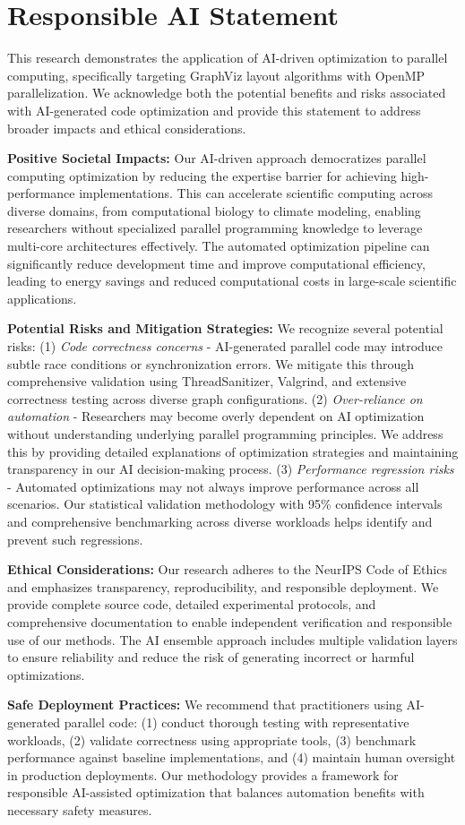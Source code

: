 \section*{Responsible AI Statement}

This research demonstrates the application of AI-driven optimization to parallel computing, specifically targeting GraphViz layout algorithms with OpenMP parallelization. We acknowledge both the potential benefits and risks associated with AI-generated code optimization and provide this statement to address broader impacts and ethical considerations.

\textbf{Positive Societal Impacts:} Our AI-driven approach democratizes parallel computing optimization by reducing the expertise barrier for achieving high-performance implementations. This can accelerate scientific computing across diverse domains, from computational biology to climate modeling, enabling researchers without specialized parallel programming knowledge to leverage multi-core architectures effectively. The automated optimization pipeline can significantly reduce development time and improve computational efficiency, leading to energy savings and reduced computational costs in large-scale scientific applications.

\textbf{Potential Risks and Mitigation Strategies:} We recognize several potential risks: (1) \textit{Code correctness concerns} - AI-generated parallel code may introduce subtle race conditions or synchronization errors. We mitigate this through comprehensive validation using ThreadSanitizer, Valgrind, and extensive correctness testing across diverse graph configurations. (2) \textit{Over-reliance on automation} - Researchers may become overly dependent on AI optimization without understanding underlying parallel programming principles. We address this by providing detailed explanations of optimization strategies and maintaining transparency in our AI decision-making process. (3) \textit{Performance regression risks} - Automated optimizations may not always improve performance across all scenarios. Our statistical validation methodology with 95\% confidence intervals and comprehensive benchmarking across diverse workloads helps identify and prevent such regressions.

\textbf{Ethical Considerations:} Our research adheres to the NeurIPS Code of Ethics and emphasizes transparency, reproducibility, and responsible deployment. We provide complete source code, detailed experimental protocols, and comprehensive documentation to enable independent verification and responsible use of our methods. The AI ensemble approach includes multiple validation layers to ensure reliability and reduce the risk of generating incorrect or harmful optimizations.

\textbf{Safe Deployment Practices:} We recommend that practitioners using AI-generated parallel code: (1) conduct thorough testing with representative workloads, (2) validate correctness using appropriate tools, (3) benchmark performance against baseline implementations, and (4) maintain human oversight in production deployments. Our methodology provides a framework for responsible AI-assisted optimization that balances automation benefits with necessary safety measures.

